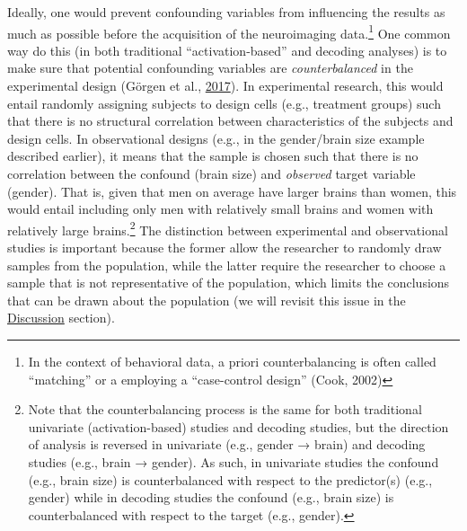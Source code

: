 \documentclass[11pt,american,a4paper,oneside,]{memoir} %
\let\rmarkdownfootnote\footnote%
\def\footnote{\protect\rmarkdownfootnote}
\begin{document}
Ideally, one would prevent confounding variables from influencing the results as much as possible before the acquisition of the neuroimaging data.\footnote{In the context of behavioral data, a priori counterbalancing is often called ``matching'' or a employing a ``case-control design'' (Cook, 2002)} One common way do this (in both traditional ``activation-based'' and decoding analyses) is to make sure that potential confounding variables are \emph{counterbalanced} in the experimental design (Görgen et al., \protect\hyperlink{ref-Gorgen2017-sy}{2017}). In experimental research, this would entail randomly assigning subjects to design cells (e.g., treatment groups) such that there is no structural correlation between characteristics of the subjects and design cells. In observational designs (e.g., in the gender/brain size example described earlier), it means that the sample is chosen such that there is no correlation between the confound (brain size) and \emph{observed} target variable (gender). That is, given that men on average have larger brains than women, this would entail including only men with relatively small brains and women with relatively large brains.\footnote{Note that the counterbalancing process is the same for both traditional univariate (activation-based) studies and decoding studies, but the direction of analysis is reversed in univariate (e.g., gender → brain) and decoding studies (e.g., brain → gender). As such, in univariate studies the confound (e.g., brain size) is counterbalanced with respect to the predictor(s) (e.g., gender) while in decoding studies the confound (e.g., brain size) is counterbalanced with respect to the target (e.g., gender).} The distinction between experimental and observational studies is important because the former allow the researcher to randomly draw samples from the population, while the latter require the researcher to choose a sample that is not representative of the population, which limits the conclusions that can be drawn about the population (we will revisit this issue in the \protect\hyperlink{confounds-decoding-discussion}{Discussion} section).
\end{document}

